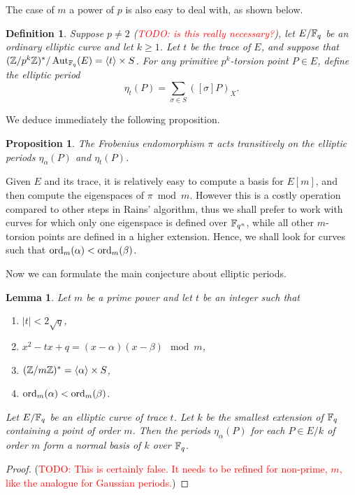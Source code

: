 \documentclass{article}
\newcommand{\todo}[1]{(\textcolor{red}{TODO: #1})}
\newtheorem{Def}{Definition}
\newtheorem{Prop}{Proposition}
\newtheorem{Lemma}{Lemma}
\begin{document}
The case of $m$ a power of $p$ is also easy to deal with, as shown
below.

\begin{Def}
  Suppose $p\ne2$ \todo{is this really necessary?}, let $E/\mathbb{F}_q$ be an
  ordinary elliptic curve and let $k\ge1$. Let $t$ be the trace of
  $E$, and suppose that $(\mathbb{Z}/p^k\mathbb{Z})^\ast/\operatorname{Aut}_{\mathbb{F}_q}(E)=\langle
  t\rangle\times S$. For any primitive $p^k$-torsion point $P\in E$,
  define the elliptic period
  \begin{equation}
    \eta_t(P) = \sum_{\sigma\in S} ([\sigma]P)_X.
  \end{equation}
\end{Def}

We deduce immediately the following proposition.

\begin{Prop}
  The Frobenius endomorphism $\pi$ acts transitively on the elliptic
  periods $\eta_\alpha(P)$ and $\eta_t(P)$.
\end{Prop}

Given $E$ and its trace, it is relatively easy to compute a basis for
$E[m]$, and then compute the eigenspaces of $\pi\bmod m$. However this
is a costly operation compared to other steps in Rains' algorithm,
thus we shall prefer to work with curves for which only one eigenspace
is defined over $\mathbb{F}_{q^n}$, while all other $m$-torsion points are
defined in a higher extension. Hence, we shall look for curves such
that $\operatorname{ord}_m(\alpha)<\operatorname{ord}_m(\beta)$.

Now we can formulate the main conjecture about elliptic periods.

\begin{Lemma}
  \label{th:elliptic-periods}
  Let $m$ be a prime power and let $t$ be an integer such that
  \begin{enumerate}
  \item $|t|<2\sqrt{q}$,
  \item $x^2-tx+q = (x-\alpha)(x-\beta) \mod m$,
  \item $(\mathbb{Z}/m\mathbb{Z})^\ast = \langle\alpha\rangle \times S$,
  \item $\operatorname{ord}_m(\alpha)<\operatorname{ord}_m(\beta)$.
  \end{enumerate}
  Let $E/\mathbb{F}_q$ be an elliptic curve of trace $t$. Let $k$ be the
  smallest extension of $\mathbb{F}_q$ containing a point of order $m$. Then
  the periods $\eta_\alpha(P)$ for each $P\in E/k$ of order $m$ form a
  normal basis of $k$ over $\mathbb{F}_q$.
\end{Lemma}
\begin{proof}
  \todo{This is certainly false. It needs to be refined for non-prime,
    $m$, like the analogue for Gaussian periods.}
\end{proof}
\end{document}
